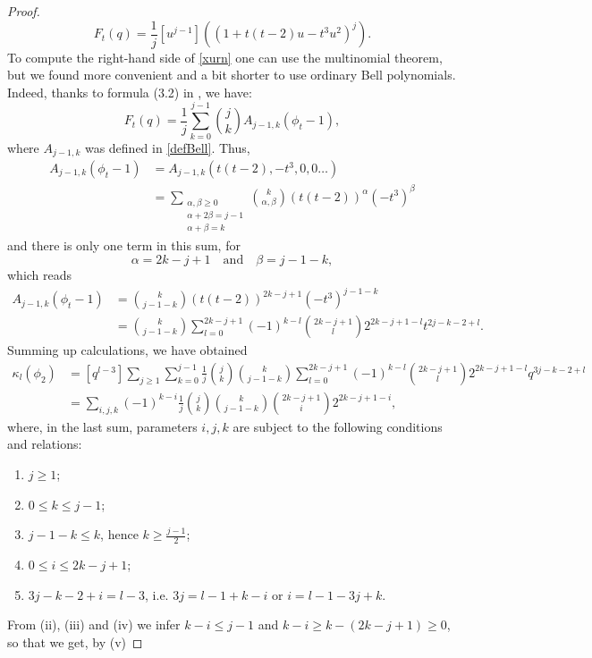 \documentclass[11pt,reqno]{amsart}
\theoremstyle{plain}
\theoremstyle{definition}
\numberwithin{figure}{section}
\numberwithin{table}{section}
\numberwithin{equation}{section}
\newcommand\al{\alpha}
\newcommand\be{\beta}
\newcommand\ka{\kappa}
\let\fr=\frac
\begin{document}
\begin{proof}
\begin{equation}
[q^j]F_t(q)=\fr 1{j}[u^{j-1}]\left((1+t(t-2)u-t^3 u^2)^j\right).
\end{equation}
To compute the right-hand side of \eqref{xurn} one can use the multinomial theorem, but we found more convenient and a bit shorter to use ordinary Bell polynomials. Indeed, thanks to formula (3.2) in \cite{OSullivan22}, we have:
\begin{equation*}
[q^j]F_t(q)=\fr 1{j}\sum_{k=0}^{j-1}\binom{j}{k}A_{j-1,k}(\phi_t-1),
\end{equation*}
where $A_{j-1,k}$ was defined in \eqref{defBell}. Thus,
\begin{align*}
A_{j-1,k}(\phi_t-1)
&=A_{j-1,k}(t(t-2),-t^3,0,0\ldots)\\
&=\sum_{\substack{\al,\be≥0\\ \al+2\be=j-1\\ \al+\be=k}}\binom{k}{\al,\be}\left(t(t-2)\right)^\al(-t^3)^\be
\end{align*}
and there is only one term in this sum, for 
\begin{equation*}
\al=2k-j+1\quad\text{and}\quad \be=j-1-k,
\end{equation*}
which reads
\begin{align*}
A_{j-1,k}(\phi_t-1)&=\binom{k}{j-1-k}\left(t(t-2)\right)^{2k-j+1}(-t^3)^{j-1-k}\\
&=\binom{k}{j-1-k}\sum_{l=0}^{2k-j+1}(-1)^{k-l}\binom{2k-j+1}{l}2^{2k-j+1-l}t^{2j-k-2+l}.
\end{align*}
Summing up calculations, we have obtained
\begin{align*}
\ka_l(\phi_2)&=[q^{l-3}]\sum_{j≥1}\sum_{k=0}^{j-1}\fr 1{j}\binom{j}{k}
\binom{k}{j-1-k}\sum_{l=0}^{2k-j+1}(-1)^{k-l}\binom{2k-j+1}{l}2^{2k-j+1-l}q^{3j-k-2+l}
\\
&=\sum_{i,j,k}(-1)^{k-i}\fr 1{j}\binom{j}{k}
\binom{k}{j-1-k}\binom{2k-j+1}{i}2^{2k-j+1-i},
\end{align*}
where, in the last sum, parameters $i,j,k$ are subject to the following conditions and relations:
\begin{enumerate}[label=(\roman*)]
\item $j≥1$;
\item $0≤k≤j-1$;
\item $j-1-k≤k$, hence $k≥{\fr{j-1}{2}}$;
\item $0≤i≤2k-j+1$;
\item $3j-k-2+i=l-3$, i.e. $3j=l-1+k-i$ or $i=l-1-3j+k$.
\end{enumerate}
From (ii), (iii) and (iv) we infer $k-i≤j-1$ and $k-i≥k-(2k-j+1)≥0$, so that we get,  by (v) 

\end{proof}
\end{document}

